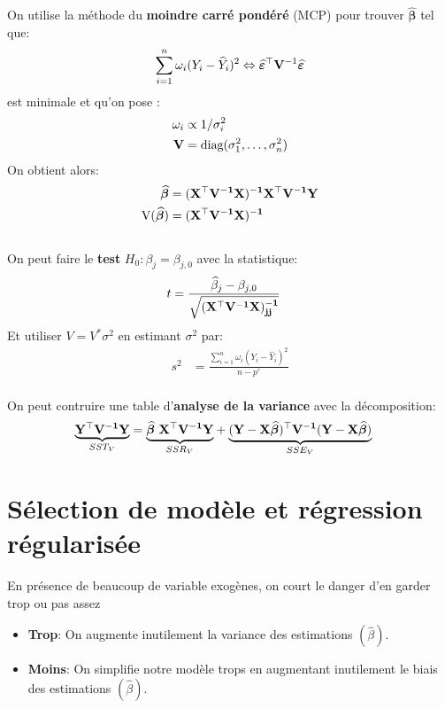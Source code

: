 \documentclass[10pt, french]{article}
\begin{document}
\begin{multicols*}{3}
On utilise la méthode du \textbf{moindre carré pondéré} (MCP) pour trouver $\widehat{\bm{\beta}}$ tel que:
\[
	\sum_{i = 1}^{n} \omega_{i}(Y_{i} - \widehat{Y}_i)^{2} \Leftrightarrow \widehat{\bm{\varepsilon}}^{\top} \mathbf{V}^{-1} \widehat{\bm{\varepsilon}}
	\]
est minimale et qu'on pose :
\begin{align*}
\omega_{i} &\propto 1/\sigma^{2}_{i} \\
\mathbf{V} &= \text{diag}(\sigma_{1}^{2}, \dots, \sigma_{n}^{2})
\end{align*}
On obtient alors:
\begin{align*}
	\widehat{\bm{\beta}} &= \mathbf{(X^{\top}V^{-1}X)^{-1}X^{\top}V^{-1}Y} \\
	\text{V}(\widehat{\bm{\beta}}) &= \mathbf{(X^{\top}V^{-1}X)^{-1}}
\end{align*}
\\
On peut faire le \textbf{test} $H_0 : \beta_j = \beta_{j, 0}$ avec la statistique:
\begin{align*}
	t &= \frac{\widehat{\beta}_{j} - \beta_{j, 0}}{\sqrt{(\mathbf{X^{\top}V^{-1}X)^{-1}_{jj}}}}
\end{align*}
Et utiliser $V = V^{*}\sigma^{2}$ en estimant $\sigma^{2}$ par:
\begin{align*}
	s^{2} &= \frac{\sum_{i = 1}^{n} \omega_{i}(Y_{i} - \widehat{Y}_i)^{2}}{n - p'}
\end{align*}
\\
On peut contruire une table d'\textbf{analyse de la variance} avec la décomposition:
\begin{align*}
	\underset{SST_V}{\underbrace{\matr{Y^{\top}V^{-1}Y}}} &= \underset{SSR_V}{\underbrace{\bm{\widehat{\beta}} \ \matr{X^{\top}V^{-1}Y}}} + \underset{SSE_V}{\underbrace{(\matr{Y - X}\bm{\widehat{\beta}})^{\top}\matr{V^{-1}}(\matr{Y - X}\bm{\widehat{\beta}}) }}
\end{align*}

\section{Sélection de modèle et régression régularisée}
En présence de beaucoup de variable exogènes, on court le danger d'en garder trop ou pas assez
\begin{itemize}
	\item \textbf{Trop}: On augmente inutilement la variance des estimations $(\hat{\beta})$.
	\item \textbf{Moins}: On simplifie notre modèle trops en augmentant inutilement le biais des estimations $(\hat{\beta})$.
\end{itemize}


\end{multicols*}
\end{document}
